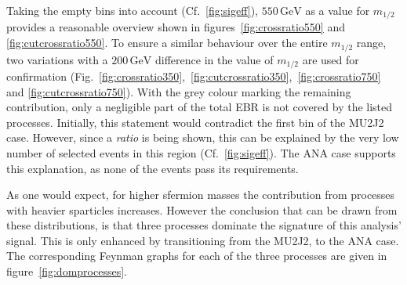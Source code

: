 Taking the empty bins into account (Cf.~\ref{fig:sigeff}), $550\,\text{GeV}$ as a value for $m_{1/2}$ provides a reasonable overview shown in figures~\ref{fig:crossratio550} and \ref{fig:cutcrossratio550}. To ensure a similar behaviour over the entire $m_{1/2}$ range, two variations with a $200\,\text{GeV}$ difference in the value of $m_{1/2}$ are used for confirmation (Fig.~\ref{fig:crossratio350},~\ref{fig:cutcrossratio350},~\ref{fig:crossratio750} and \ref{fig:cutcrossratio750}). With the grey colour marking the remaining contribution, only a negligible part of the total EBR is not covered by the listed processes. Initially, this statement would contradict the first bin of the MU2J2 case. However, since a \textit{ratio} is being shown, this can be explained by the very low number of selected events in this region (Cf.~\ref{fig:sigeff}). The ANA case supports this explanation, as none of the events pass its requirements.

As one would expect, for higher sfermion masses the contribution from processes with heavier sparticles increases. However the conclusion that can be drawn from these distributions, is that three processes dominate the signature of this analysis' signal. This is only enhanced by transitioning from the MU2J2, to the ANA case. The corresponding Feynman graphs for each of the three processes are given in figure~\ref{fig:domprocesses}.

